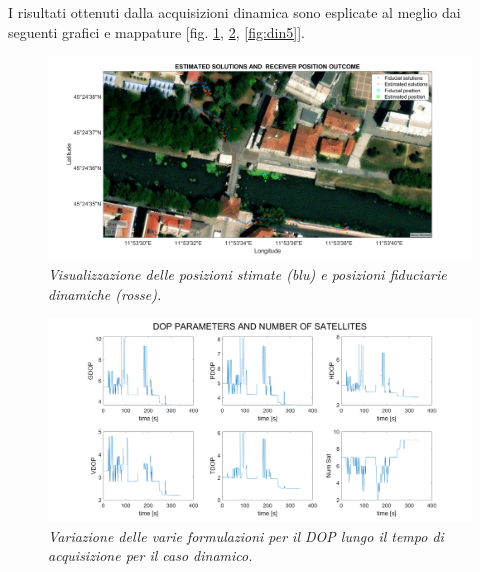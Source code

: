 \documentclass[a4paper,11pt,twoside]{book}
\begin{document}
	I risultati ottenuti dalla acquisizioni dinamica sono esplicate al meglio dai seguenti grafici e mappature [fig. \ref{fig:din2}, \ref{fig:din3}, \ref{fig:din5}].
	
	\begin{figure}[H]
		\centering
		\includegraphics[scale=0.30]{"Immagini workbook/Immagini esp3/din2"}
		\caption{\textit{Visualizzazione delle posizioni stimate (blu) e posizioni fiduciarie dinamiche (rosse).}}
		\label{fig:din2}
	\end{figure}
	
	\vspace{-0.5cm}
	
	\begin{figure}[H]
		\centering
		\includegraphics[scale=0.25]{"Immagini workbook/Immagini esp3/din3"}
		\caption{\textit{Variazione delle varie formulazioni per il DOP lungo il tempo di acquisizione per il caso dinamico.}}
		\label{fig:din3}
	\end{figure}
	
	\vspace{-0.5cm}
	
	
\end{document}
